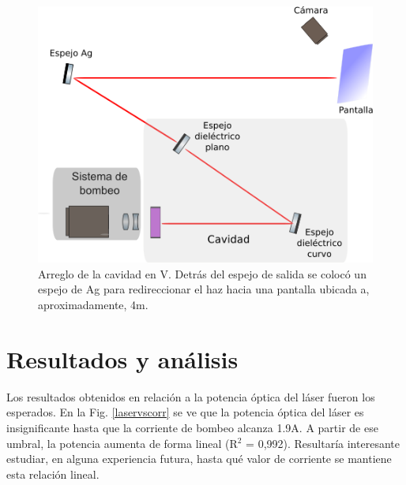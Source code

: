 \documentclass[10pt, a4paper]{article}%
\begin{document}
\begin{multicols}{2}
\begin{figure}[H]
    \centering
    \includegraphics[scale=0.5]{Graficos/cavV1.png}
    \caption{Arreglo de la cavidad en V. Detrás del espejo de salida se colocó un espejo de Ag para redireccionar el haz hacia una pantalla ubicada a, aproximadamente, 4m.}
    \label{cavV1}
\end{figure}




\section*{Resultados y análisis}

Los resultados obtenidos en relación a la potencia óptica del láser fueron los esperados. En la Fig. \ref{laservscorr} se ve que la potencia óptica del láser es insignificante hasta que la corriente de bombeo alcanza 1.9A. A partir de ese umbral, la potencia aumenta de forma lineal  (R$^2$ = 0,992).
Resultaría interesante estudiar, en alguna experiencia futura, hasta qué valor de corriente se mantiene esta relación lineal.


\end{multicols}
\end{document}
